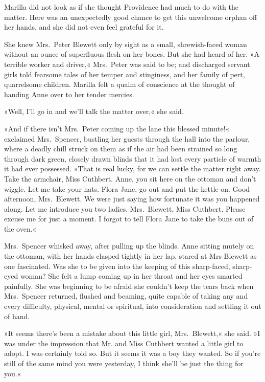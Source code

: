 Marilla did not look as if she thought Providence had much to do with the matter. Here was an unexpectedly good chance to get this unwelcome orphan off her hands, and she did not even feel grateful for it.

She knew Mrs.~Peter Blewett only by sight as a small, shrewish-faced woman without an ounce of superfluous flesh on her bones. But she had heard of her. »A terrible worker and driver,« Mrs.~Peter was said to be; and discharged servant girls told fearsome tales of her temper and stinginess, and her family of pert, quarrelsome children. Marilla felt a qualm of conscience at the thought of handing Anne over to her tender mercies.

»Well, I'll go in and we'll talk the matter over,« she said.

»And if there isn't Mrs.~Peter coming up the lane this blessed minute!« exclaimed Mrs.~Spencer, bustling her guests through the hall into the parlour, where a deadly chill struck on them as if the air had been strained so long through dark green, closely drawn blinds that it had lost every particle of warmth it had ever possessed. »That is real lucky, for we can settle the matter right away. Take the armchair, Miss Cuthbert. Anne, you sit here on the ottoman and don't wiggle. Let me take your hats. Flora Jane, go out and put the kettle on. Good afternoon, Mrs.~Blewett. We were just saying how fortunate it was you happened along. Let me introduce you two ladies. Mrs.~Blewett, Miss Cuthbert. Please excuse me for just a moment. I forgot to tell Flora Jane to take the buns out of the oven.«

Mrs.~Spencer whisked away, after pulling up the blinds. Anne sitting mutely on the ottoman, with her hands clasped tightly in her lap, stared at Mrs Blewett as one fascinated. Was she to be given into the keeping of this sharp-faced, sharp-eyed woman? She felt a lump coming up in her throat and her eyes smarted painfully. She was beginning to be afraid she couldn't keep the tears back when Mrs.~Spencer returned, flushed and beaming, quite capable of taking any and every difficulty, physical, mental or spiritual, into consideration and settling it out of hand.

»It seems there's been a mistake about this little girl, Mrs.~Blewett,« she said. »I was under the impression that Mr. and Miss Cuthbert wanted a little girl to adopt. I was certainly told so. But it seems it was a boy they wanted. So if you're still of the same mind you were yesterday, I think she'll be just the thing for you.«

